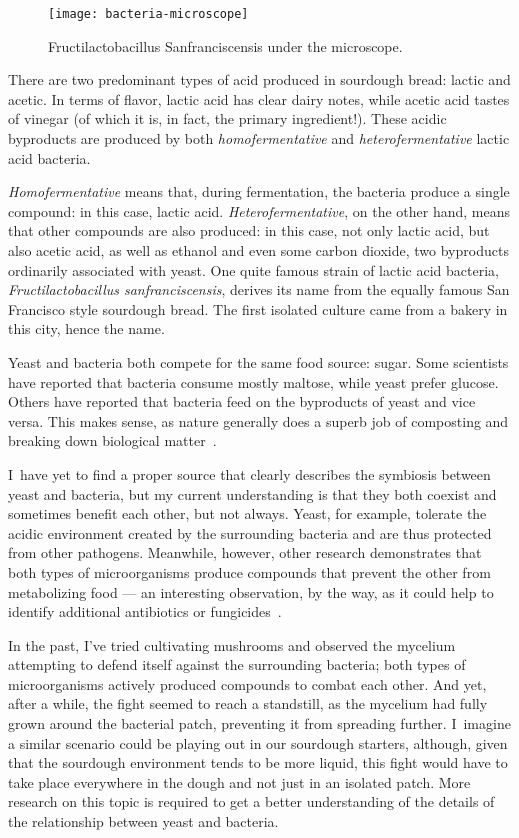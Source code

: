 \begin{figure}
  \texttt{[image: bacteria-microscope]}
  \caption[Bacteria under the microscope]{Fructilactobacillus Sanfranciscensis
      under the microscope.}%
  \label{lactobacillus-franciscensis-microscope}
\end{figure}

There are two predominant types of acid produced in sourdough bread: lactic and
acetic. In terms of flavor, lactic acid has clear dairy notes, while acetic
acid tastes of vinegar (of which it is, in fact, the primary ingredient!). These
acidic byproducts are produced by both \emph{homofermentative} and
\emph{heterofermentative} lactic acid bacteria.

\emph{Homofermentative} means that, during fermentation, the bacteria produce
a single compound: in this case, lactic acid. \emph{Heterofermentative}, on
the other hand, means that other compounds are also produced: in this case,
not only lactic acid, but also acetic acid, as well as ethanol and even some
carbon dioxide, two byproducts ordinarily associated with yeast. One quite
famous strain of lactic acid bacteria, \emph{Fructilactobacillus sanfranciscensis},
derives its name from the equally famous San Francisco style sourdough bread.
The first isolated culture came from a bakery in this city, hence the name.

Yeast and bacteria both compete for the same food source: sugar. Some scientists
have reported that bacteria consume mostly maltose, while yeast prefer glucose.
Others have reported that bacteria feed on the byproducts of yeast and vice
versa. This makes sense, as nature generally does a superb job of composting
and breaking down biological matter~\cite{lactobacillus+sanfrancisco}.

I~have yet to find a proper source that clearly describes the symbiosis between
yeast and bacteria, but my current understanding is that they both coexist and
sometimes benefit each other, but not always. Yeast, for example, tolerate the
acidic environment created by the surrounding bacteria and are thus protected
from other pathogens. Meanwhile, however, other research demonstrates that both
types of microorganisms produce compounds that prevent the other from
metabolizing food --- an interesting observation, by the way, as it could help to
identify additional antibiotics or fungicides~\cite{mold+lactic+acid+bacteria}.

In the past, I've tried cultivating mushrooms and observed the mycelium
attempting to defend itself against the surrounding bacteria; both types of
microorganisms actively produced compounds to combat each other. And yet,
after a while, the fight seemed to reach a standstill, as the mycelium had
fully grown around the bacterial patch, preventing it from spreading further.
I~imagine a similar scenario could be playing out in our sourdough starters,
although, given that the sourdough environment tends to be more liquid, this
fight would have to take place everywhere in the dough and not just in an
isolated patch. More research on this topic is required to get a better understanding of
the details of the relationship between yeast and bacteria.


